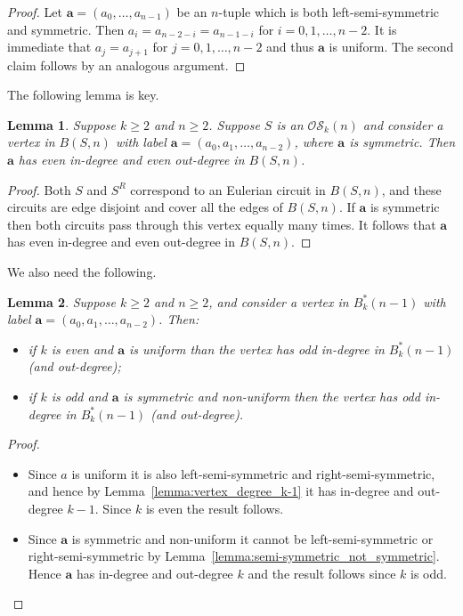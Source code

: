 \documentclass[a4paper,11pt]{article}
\newtheorem{lemma}{Lemma}[section]
\begin{document}
\begin{proof}
Let $\mathbf a=(a_0,\dots,a_{n-1})$ be an $n$-tuple which is both left-semi-symmetric and
symmetric. Then $a_i=a_{n-2-i}=a_{n-1-i}$ for $i=0,1,\dots,n-2$. It is immediate that $a_j=a_{j+1}$
for $j=0,1,\dots,n-2$ and thus $\mathbf a$ is uniform. The second claim follows by an analogous
argument.
\end{proof}


The following lemma is key.

\begin{lemma}  \label{lemma:symmetric_vertex_even_degree}
Suppose $k\geq2$ and $n\geq2$.  Suppose $S$ is an $\mathcal{OS}_k(n)$ and consider a vertex in
$B(S,n)$ with label $\mathbf{a}=(a_0,a_1,\ldots,a_{n-2})$, where $\mathbf{a}$ is symmetric.  Then
$\mathbf{a}$ has even in-degree and even out-degree in $B(S,n)$.
\end{lemma}

\begin{proof}
Both $S$ and $S^R$ correspond to an Eulerian circuit in $B(S,n)$, and these circuits are edge
disjoint and cover all the edges of $B(S,n)$. If $\mathbf{a}$ is symmetric then both circuits pass
through this vertex equally many times. It follows that $\mathbf{a}$ has even in-degree and even
out-degree in $B(S,n)$.
\end{proof}

We also need the following.

\begin{lemma}  \label{lemma:vertex-parity}
Suppose $k\geq2$ and $n\geq2$, and consider a vertex in $B^*_k(n-1)$ with label
$\mathbf{a}=(a_0,a_1,\ldots,a_{n-2})$.  Then:
\begin{itemize}
\item[i)] if $k$ is even and $\mathbf{a}$ is uniform than the vertex has odd in-degree in
    $B^*_k(n-1)$ (and out-degree);
\item[ii)] if $k$ is odd and $\mathbf{a}$ is symmetric and non-uniform then the vertex has odd
    in-degree in $B^*_k(n-1)$ (and out-degree).
\end{itemize}
\end{lemma}

\begin{proof}
\begin{itemize}
\item[i)] Since $a$ is uniform it is also left-semi-symmetric and right-semi-symmetric, and
    hence by Lemma~\ref{lemma:vertex_degree_k-1} it has in-degree and out-degree $k-1$.  Since
    $k$ is even the result follows.
\item[ii)] Since $\mathbf{a}$ is symmetric and non-uniform it cannot be left-semi-symmetric or
    right-semi-symmetric by Lemma~\ref{lemma:semi-symmetric_not_symmetric}.  Hence $\mathbf{a}$
    has in-degree and out-degree $k$ and the result follows since $k$ is odd.
\end{itemize}
\end{proof}
\end{document}
